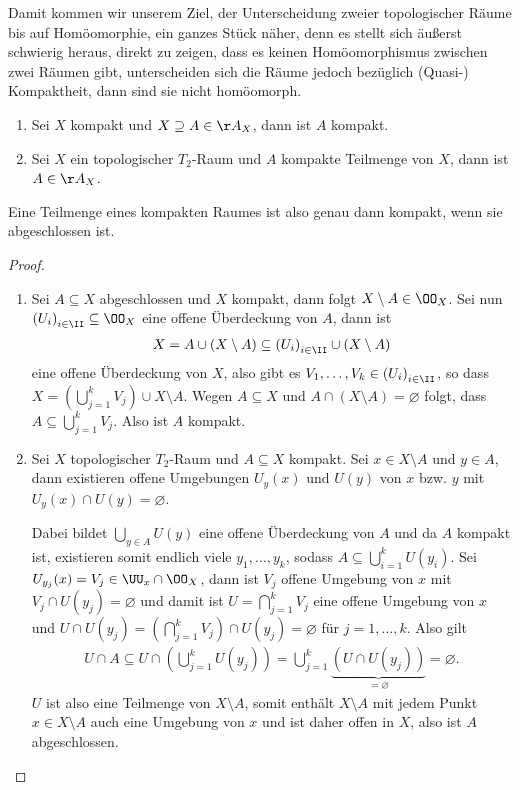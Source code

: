 Damit kommen wir unserem Ziel, der Unterscheidung zweier topologischer Räume
bis auf Homöomorphie, ein ganzes Stück näher, denn es stellt sich äußerst
schwierig heraus, direkt zu zeigen, dass es keinen Homöomorphismus zwischen
zwei Räumen gibt, unterscheiden sich die Räume jedoch bezüglich
(Quasi-) Kompaktheit, dann sind sie nicht homöomorph.

\begin{prop}
\label{prop:2.3.4}
\begin{enumerate}
  \item\label{prop:2.3.4:1} Sei $X$ kompakt und $X\supseteq A\in\AA_X$, dann ist
  $A$ kompakt.
  \item\label{prop:2.3.4:2} Sei $X$ ein topologischer $T_2$-Raum und $A$
  kompakte Teilmenge von $X$, dann ist $A\in\AA_X$.
\end{enumerate}

Eine Teilmenge eines kompakten Raumes ist also genau dann kompakt, wenn sie
abgeschlossen ist.\fishhere
\end{prop}

\begin{proof}
\begin{enumerate}
  \item Sei $A\subseteq X$ abgeschlossen und $X$ kompakt, dann folgt
  $X\setminus A \in\OO_X$. Sei nun $\left(U_i\right)_{i\in\II}\subseteq \OO_X$
  eine offene Überdeckung von $A$, dann ist
\begin{align*}
X=A\cup (X\setminus A)\subseteq   \left(U_i\right)_{i\in\II} \cup (X\setminus A) 
\end{align*}  
eine offene Überdeckung von $X$, also gibt es $V_1,\ldots,V_k\in
\left(U_i\right)_{i\in\II}$, so dass $X=\left(\bigcup_{j=1}^k V_j \right)\cup
X\setminus A$. Wegen $A\subseteq X$ und $A\cap (X\setminus A) = \varnothing$ folgt, dass $A\subseteq
  \bigcup_{j=1}^k V_j$. Also ist $A$ kompakt.
  \item Sei $X$ topologischer $T_2$-Raum und $A\subseteq X$ kompakt. Sei $x\in
  X\setminus A$ und $y\in A$, dann existieren offene Umgebungen $U_y(x)$ und
  $U(y)$ von $x$ bzw. $y$ mit $U_y(x)\cap U(y) = \varnothing$.
  
  Dabei bildet $\bigcup_{y\in A} U(y)$ eine offene Überdeckung von $A$ und da
  $A$ kompakt ist, existieren somit endlich viele $y_1,\ldots,y_k$, sodass
  $A\subseteq \bigcup_{i=1}^k U(y_i)$. Sei $U_{y_j}(x) = V_j\in
  \UU_x\cap\OO_X$, dann ist $V_j$ offene Umgebung von $x$ mit $V_j\cap U(y_j) =
  \varnothing$ und damit ist $U=\bigcap_{j=1}^k V_j$ eine offene Umgebung von
  $x$ und $U\cap U(y_j) = (\bigcap_{j=1}^k V_j)\cap U(y_j) =\varnothing$ für
  $j=1,\ldots,k$. Also gilt
  \begin{align*}
  U\cap A \subseteq U\cap \left(\bigcup_{j=1}^k U(y_j) \right) =
  \bigcup_{j=1}^k \underbrace{\left(U\cap U(y_j)\right)}_{=\varnothing}  =
  \varnothing.
  \end{align*}
$U$ ist also eine Teilmenge von $X\setminus A$, somit enthält $X\setminus A$
mit jedem Punkt $x\in X\setminus A$ auch eine Umgebung von $x$ und ist daher
offen in $X$, also ist $A$ abgeschlossen.\qedhere
\end{enumerate}
\end{proof}

